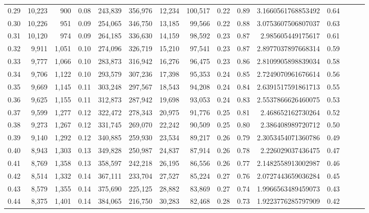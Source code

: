 \begin{tabular}{rrrrrrrrrrrrrrr}
0.29 &  10,223 &    900 &  0.08 &  243,839 &  356,976 &   12,234 &  100,517 &  0.22 &  0.89 &     3.1660561768853492 &      0.64 \\
0.30 &  10,226 &    951 &  0.09 &  254,065 &  346,750 &   13,185 &   99,566 &  0.22 &  0.88 &     3.0753607506807037 &      0.63 \\
0.31 &  10,120 &    974 &  0.09 &  264,185 &  336,630 &   14,159 &   98,592 &  0.23 &  0.87 &      2.985605449175617 &      0.61 \\
0.32 &   9,911 &  1,051 &  0.10 &  274,096 &  326,719 &   15,210 &   97,541 &  0.23 &  0.87 &     2.8977037897668314 &      0.59 \\
0.33 &   9,777 &  1,066 &  0.10 &  283,873 &  316,942 &   16,276 &   96,475 &  0.23 &  0.86 &     2.8109905898839034 &      0.58 \\
0.34 &   9,706 &  1,122 &  0.10 &  293,579 &  307,236 &   17,398 &   95,353 &  0.24 &  0.85 &     2.7249070961676614 &      0.56 \\
0.35 &   9,669 &  1,145 &  0.11 &  303,248 &  297,567 &   18,543 &   94,208 &  0.24 &  0.84 &     2.6391517591861713 &      0.55 \\
0.36 &   9,625 &  1,155 &  0.11 &  312,873 &  287,942 &   19,698 &   93,053 &  0.24 &  0.83 &     2.5537866626460075 &      0.53 \\
0.37 &   9,599 &  1,277 &  0.12 &  322,472 &  278,343 &   20,975 &   91,776 &  0.25 &  0.81 &      2.468652162730264 &      0.52 \\
0.38 &   9,273 &  1,267 &  0.12 &  331,745 &  269,070 &   22,242 &   90,509 &  0.25 &  0.80 &      2.386408989720712 &      0.50 \\
0.39 &   9,140 &  1,292 &  0.12 &  340,885 &  259,930 &   23,534 &   89,217 &  0.26 &  0.79 &     2.3053454071360786 &      0.49 \\
0.40 &   8,943 &  1,303 &  0.13 &  349,828 &  250,987 &   24,837 &   87,914 &  0.26 &  0.78 &      2.226029037436475 &      0.47 \\
0.41 &   8,769 &  1,358 &  0.13 &  358,597 &  242,218 &   26,195 &   86,556 &  0.26 &  0.77 &     2.1482558913002987 &      0.46 \\
0.42 &   8,514 &  1,332 &  0.14 &  367,111 &  233,704 &   27,527 &   85,224 &  0.27 &  0.76 &     2.0727443659036284 &      0.45 \\
0.43 &   8,579 &  1,355 &  0.14 &  375,690 &  225,125 &   28,882 &   83,869 &  0.27 &  0.74 &     1.9966563489459073 &      0.43 \\
0.44 &   8,375 &  1,401 &  0.14 &  384,065 &  216,750 &   30,283 &   82,468 &  0.28 &  0.73 &     1.9223776285797909 &      0.42 \\

\end{tabular}
